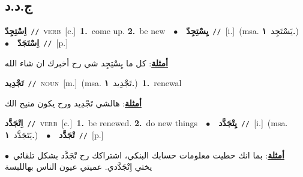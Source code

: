 \documentclass[10pt,a4paper,twoside]{article} %
\begin{document}
\begin{multicols}{2}
{{{{{{{{{{\vspace{-3mm}
\subsection*{\color{blue}\foreignlanguage{arabic}{ج.د.د}\color{blue}{}} 

{\setlength\topsep{0pt}\textbf{\foreignlanguage{arabic}{اِسْتِجِدّ}}\ {\color{gray}\texttt{//}\color{black}}\ \textsc{verb}\ [c.]\ \textbf{1.}~come up.  \textbf{2.}~be new\ \ $\bullet$\ \ \setlength\topsep{0pt}\textbf{\foreignlanguage{arabic}{يِسْتِجِدّ}}\ {\color{gray}\texttt{//}\color{black}}\ [i.]\ \color{gray}(msa. \foreignlanguage{arabic}{يَسْتَجِد}~\foreignlanguage{arabic}{\textbf{١.}})\color{black}\ \ $\bullet$\ \ \setlength\topsep{0pt}\textbf{\foreignlanguage{arabic}{اِسْتَجَدّ}}\ {\color{gray}\texttt{//}\color{black}}\ [p.]\  \begin{flushright}\color{gray}\foreignlanguage{arabic}{\textbf{\underline{\foreignlanguage{arabic}{أمثلة}}}: كل ما يِسْتِجِد شي رح أخبرك ان شاء الله}\end{flushright}\color{black}} \vspace{2mm}

{\setlength\topsep{0pt}\textbf{\foreignlanguage{arabic}{تَجْدِيد}}\ {\color{gray}\texttt{//}\color{black}}\ \textsc{noun}\ [m.]\ \color{gray}(msa. \foreignlanguage{arabic}{تَجْدِيد}~\foreignlanguage{arabic}{\textbf{١.}})\color{black}\ \textbf{1.}~renewal\  \begin{flushright}\color{gray}\foreignlanguage{arabic}{\textbf{\underline{\foreignlanguage{arabic}{أمثلة}}}: هالشي تَجْدِيد ورح يكون منيح الك}\end{flushright}\color{black}} \vspace{2mm}

{\setlength\topsep{0pt}\textbf{\foreignlanguage{arabic}{اِتْجَدَّد}}\ {\color{gray}\texttt{//}\color{black}}\ \textsc{verb}\ [c.]\ \textbf{1.}~be renewed.  \textbf{2.}~do new things\ \ $\bullet$\ \ \setlength\topsep{0pt}\textbf{\foreignlanguage{arabic}{يِتْجَدَّد}}\ {\color{gray}\texttt{//}\color{black}}\ [i.]\ \color{gray}(msa. \foreignlanguage{arabic}{يَتَجَدَّد}~\foreignlanguage{arabic}{\textbf{١.}})\color{black}\ \ $\bullet$\ \ \setlength\topsep{0pt}\textbf{\foreignlanguage{arabic}{تْجَدَّد}}\ {\color{gray}\texttt{//}\color{black}}\ [p.]\  \begin{flushright}\color{gray}\foreignlanguage{arabic}{\textbf{\underline{\foreignlanguage{arabic}{أمثلة}}}: بما انك حطيت معلومات حسابك البنكي، اشتراكك رح تْجَدَّد بشكل تلقائي\ $\bullet$\ \  يختي اِتْجَدَّدي. عميتي عيون الناس بهاللبسة}\end{flushright}\color{black}} \vspace{2mm}

}}}}}}}}}}
\end{multicols}
\end{document}
